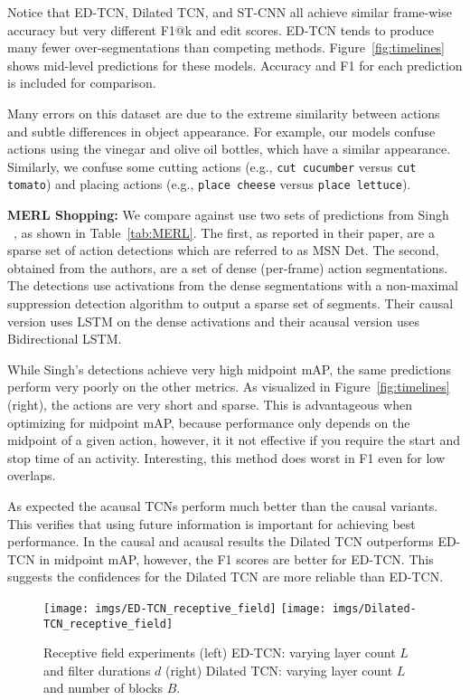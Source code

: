 \documentclass[10pt,twocolumn,letterpaper]{article}
\newcommand{\fakesubsection}[1]{\smallskip\noindent\textbf{#1:}}
\begin{document}
Notice that ED-TCN, Dilated TCN, and ST-CNN all achieve similar frame-wise accuracy but very different F1@k and edit scores. ED-TCN tends to produce many fewer over-segmentations than competing methods. Figure~\ref{fig:timelines} shows mid-level predictions for these models. Accuracy and F1 for each prediction is included for comparison.

Many errors on this dataset are due to the extreme similarity between actions and subtle differences in object appearance. For example, our models confuse actions using the vinegar and olive oil bottles, which have a similar appearance.
Similarly, we confuse some cutting actions (e.g., \texttt{cut cucumber} versus \texttt{cut tomato}) and placing actions (e.g., \texttt{place cheese} versus \texttt{place lettuce}).




\fakesubsection{MERL Shopping}
We compare against use two sets of predictions from Singh \etal~\cite{singh_cvpr_2016_merl}, as shown in Table~\ref{tab:MERL}. The first, as reported in their paper, are a sparse set of action detections which are referred to as MSN Det. The second, obtained from the authors, are a set of dense (per-frame) action segmentations. The detections use activations from the dense segmentations with a non-maximal suppression detection algorithm to output a sparse set of segments. Their causal version uses LSTM on the dense activations and their acausal version uses Bidirectional LSTM. 

While Singh's detections achieve very high midpoint mAP, the same predictions perform very poorly on the other metrics. As visualized in Figure~\ref{fig:timelines} (right), the actions are very short and sparse. This is advantageous when optimizing for midpoint mAP, because performance only depends on the midpoint of a given action, however, it it not effective if you require the start and stop time of an activity. 
Interesting, this method does worst in F1 even for low overlaps. 

As expected the acausal TCNs perform much better than the causal variants. This verifies that using future information is important for achieving best performance. In the causal and acausal results the Dilated TCN outperforms ED-TCN in midpoint mAP, however, the F1 scores are better for ED-TCN. This suggests the confidences for the Dilated TCN are more reliable than ED-TCN. 

\begin{figure}
	\center
	\texttt{[image: imgs/ED-TCN\_receptive\_field]} 
	\texttt{[image: imgs/Dilated-TCN\_receptive\_field]}
	\caption{Receptive field experiments (left) ED-TCN: varying layer count $L$ and filter durations $d$  (right) Dilated TCN: varying layer count $L$ and  number of blocks $B$.}
	\label{fig:receptive_field}
\end{figure}
\end{document}
